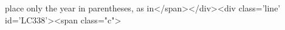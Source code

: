 place only the year in parentheses, as in</span></div><div class='line' id='LC338'><span class="c">%